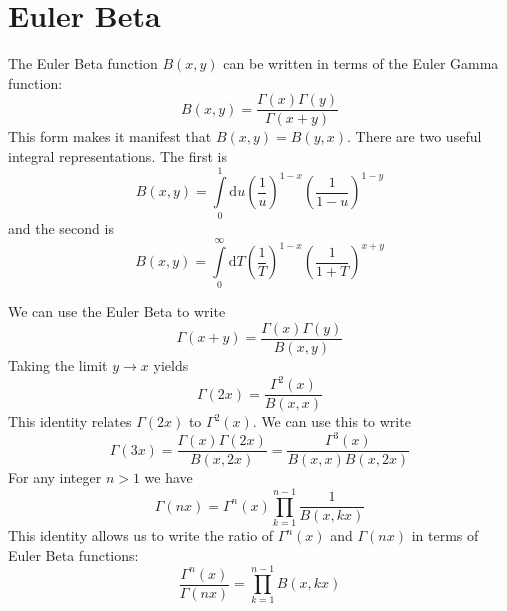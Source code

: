 \section{Euler Beta}
The Euler Beta function $B(x, y)$ can be written in terms of the Euler Gamma function:
\begin{equation}
	B(x, y) = \frac{\Gamma(x) \Gamma(y)}{\Gamma(x + y)}
\end{equation}
This form makes it manifest that $B(x, y) = B(y, x)$. There are two useful integral representations. The first is
\begin{equation}
	B(x, y) = \int\limits_{0}^{1} \mathrm{d}u \left( \frac{1}{u} \right)^{1-x} \left( \frac{1}{1 - u} \right)^{1 - y}
\end{equation}
and the second is
\begin{equation}
	B(x, y) = \int\limits_{0}^{\infty} \mathrm{d}T \left( \frac{1}{T} \right)^{1-x} \left( \frac{1}{1 + T} \right)^{x + y}
\end{equation}

We can use the Euler Beta to write
\begin{equation}
	\Gamma(x + y) = \frac{\Gamma(x) \Gamma(y)}{B(x, y)} \label{GammaPlus}
\end{equation}
Taking the limit $y \rightarrow x$ yields
\begin{equation}
	\Gamma(2x) = \frac{\Gamma^{2}(x)}{B(x, x)}
\end{equation}
This identity relates $\Gamma(2x)$ to $\Gamma^{2}(x)$. We can use this to write
\begin{equation}
	\Gamma(3x) = \frac{\Gamma(x) \Gamma(2x)}{B(x, 2x)} = \frac{\Gamma^{3}(x)}{B(x, x) B(x, 2x)}
\end{equation}
For any integer $n > 1$ we have
\begin{equation}
	\Gamma(n x) = \Gamma^{n}(x) \prod_{k = 1}^{n - 1} \frac{1}{B(x, k x)}
\end{equation}
This identity allows us to write the ratio of $\Gamma^{n}(x)$ and $\Gamma(n x)$ in terms of Euler Beta functions:
\begin{equation}
	\frac{\Gamma^{n}(x)}{\Gamma(n x)} = \prod_{k = 1}^{n - 1} B(x, k x)
\end{equation}

